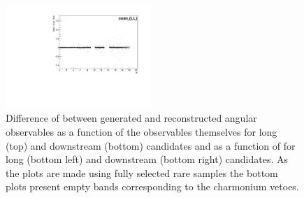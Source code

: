 \begin{figure}
\includegraphics[width=0.49\textwidth]{Lmumu/figs/resolution/RmTcosThetaL_vs_q2_LL.pdf}
 \caption{Difference of between generated and reconstructed angular observables as a function of 
 the observables themselves for long (top) and downstream (bottom) candidates and as a function 
 of \qsq for long (bottom left) and downstream (bottom right) candidates.
 As the plots are made using fully selected rare samples the bottom plots present empty bands
 corresponding to the charmonium vetoes.
 }
\label{fig:resolutionvsq2ang}
\end{figure}

